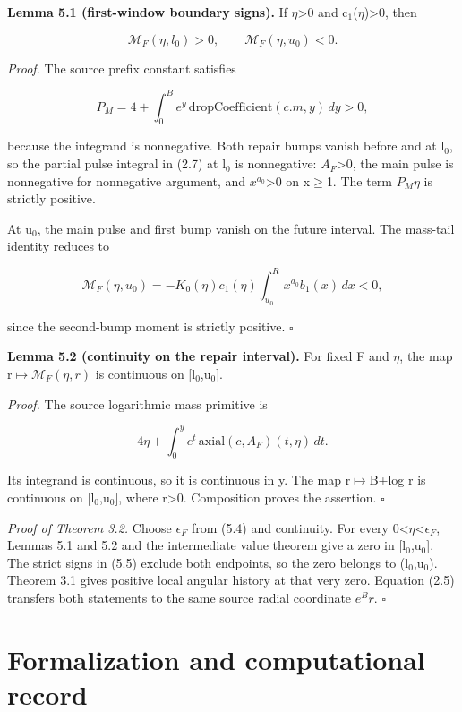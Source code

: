\documentclass[11pt,a4paper]{article}
\begin{document}
\textbf{Lemma 5.1 (first-window boundary signs).} If \ensuremath{\eta}>0 and c\ensuremath{{}_1}(\ensuremath{\eta})>0, then

\[
\mathcal M_F(\eta,l_0)>0,\qquad
\mathcal M_F(\eta,u_0)<0. \tag{5.5}
\]

\emph{Proof.} The source prefix constant satisfies

\[
P_M=4+\int_0^B e^y\,\mathrm{dropCoefficient}(c.m,y)\,dy>0,
\]

because the integrand is nonnegative. Both repair bumps vanish before and at l\ensuremath{{}_0}, so the partial pulse integral in (2.7) at l\ensuremath{{}_0} is nonnegative: \(A_F\)>0, the main pulse is nonnegative for nonnegative argument, and \(x^{a_0}\)>0 on x\ensuremath{\ge}1. The term \(P_M\)\ensuremath{\eta} is strictly positive.

At u\ensuremath{{}_0}, the main pulse and first bump vanish on the future interval. The mass-tail identity reduces to

\[
\mathcal M_F(\eta,u_0)=-K_0(\eta)c_1(\eta)
\int_{u_0}^R x^{a_0}b_1(x)\,dx<0,
\]

since the second-bump moment is strictly positive. \hfill\ensuremath{\square}

\textbf{Lemma 5.2 (continuity on the repair interval).} For fixed F and \ensuremath{\eta}, the map r\ensuremath{\mapsto}\(\mathcal M_F(\eta,r)\) is continuous on [l\ensuremath{{}_0},u\ensuremath{{}_0}].

\emph{Proof.} The source logarithmic mass primitive is

\[
4\eta+\int_0^y e^t\,\mathrm{axial}(c,A_F)(t,\eta)\,dt.
\]

Its integrand is continuous, so it is continuous in y. The map r\ensuremath{\mapsto}B+log r is continuous on [l\ensuremath{{}_0},u\ensuremath{{}_0}], where r>0. Composition proves the assertion. \hfill\ensuremath{\square}

\emph{Proof of Theorem 3.2.} Choose \(\epsilon _F\) from (5.4) and continuity. For every 0<\ensuremath{\eta}<\(\epsilon _F\), Lemmas 5.1 and 5.2 and the intermediate value theorem give a zero in [l\ensuremath{{}_0},u\ensuremath{{}_0}]. The strict signs in (5.5) exclude both endpoints, so the zero belongs to (l\ensuremath{{}_0},u\ensuremath{{}_0}). Theorem 3.1 gives positive local angular history at that very zero. Equation (2.5) transfers both statements to the same source radial coordinate \(e^B r\). \hfill\ensuremath{\square}

\section{Formalization and computational record}
\end{document}

